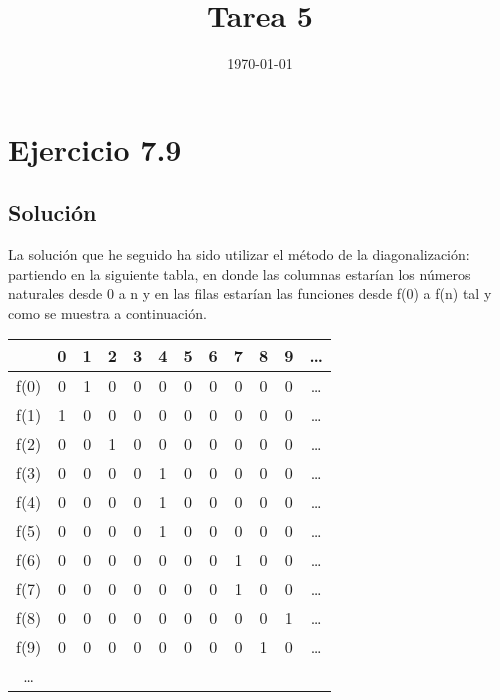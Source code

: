 \documentclass[11pt, a4paper, titlepage]{article}
\begin{document}
\title{Tarea 5}
\date{\today}
\maketitle
\newpage

\section*{Ejercicio 7.9}
\subsection*{Solución}
La solución que he seguido ha sido utilizar el método de la diagonalización:
partiendo en la siguiente tabla, en donde las columnas estarían los números
naturales desde 0 a n y en las filas estarían las funciones desde f(0) a f(n)
tal y como se muestra a continuación.

\begin{center}
  \begin{tabular}{|c c c c c c c c c c c c|}
    \hline
    \, & 0 & 1 & 2 & 3 & 4 & 5 & 6 & 7 & 8 & 9 & \ldots \\ \hline
    f(0) & 0 & 1 & 0 & 0 & 0 & 0 & 0 & 0 & 0 & 0 & \ldots \\ \hline
    f(1) & 1 & 0 & 0 & 0 & 0 & 0 & 0 & 0 & 0 & 0 & \ldots \\ \hline
    f(2) & 0 & 0 & 1 & 0 & 0 & 0 & 0 & 0 & 0 & 0 & \ldots \\ \hline
    f(3) & 0 & 0 & 0 & 0 & 1 & 0 & 0 & 0 & 0 & 0 & \ldots \\ \hline
    f(4) & 0 & 0 & 0 & 0 & 1 & 0 & 0 & 0 & 0 & 0 & \ldots \\ \hline
    f(5) & 0 & 0 & 0 & 0 & 1 & 0 & 0 & 0 & 0 & 0 & \ldots \\ \hline
    f(6) & 0 & 0 & 0 & 0 & 0 & 0 & 0 & 1 & 0 & 0 & \ldots \\ \hline
    f(7) & 0 & 0 & 0 & 0 & 0 & 0 & 0 & 1 & 0 & 0 & \ldots \\ \hline
    f(8) & 0 & 0 & 0 & 0 & 0 & 0 & 0 & 0 & 0 & 1 & \ldots \\ \hline
    f(9) & 0 & 0 & 0 & 0 & 0 & 0 & 0 & 0 & 1 & 0 & \ldots \\ \hline
    \ldots
    
  \end{tabular}
\end{center}
\end{document}

